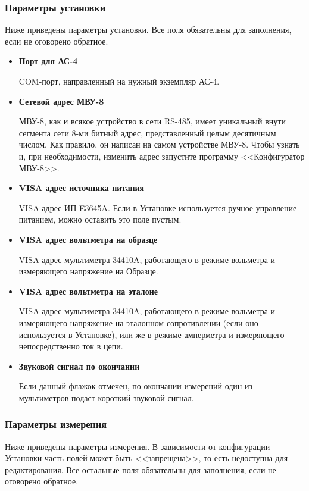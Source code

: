 \documentclass[12pt, a4paper, twocolumn]{report}
\newcommand{\PARAM}[1]{\item {\bf #1} }
\begin{document}
\subsubsection{Параметры установки}

Ниже приведены параметры установки. Все поля обязательны для заполнения, если не оговорено обратное.

\begin{itemize}

\PARAM{Порт для АС-4}

COM-порт, направленный на нужный экземпляр АС-4. 

\PARAM{Сетевой адрес МВУ-8}

МВУ-8, как и всякое устройство в сети RS-485, имеет уникальный внути сегмента сети 8-ми битный адрес, представленный целым десятичным числом. Как правило, он написан на самом устройстве МВУ-8. Чтобы узнать и, при необходимости, изменить адрес запустите программу <<Конфигуратор МВУ-8>>.

\PARAM{VISA адрес источника питания}

VISA-адрес ИП E3645A. Если в Установке используется ручное управление питанием, можно оставить это поле пустым.

\PARAM{VISA адрес вольтметра на образце}

VISA-адрес мультиметра 34410A, работающего в режиме вольметра и измеряющего напряжение на Образце.

\PARAM{VISA адрес вольтметра на эталоне}

VISA-адрес мультиметра 34410A, работающего в режиме вольметра и измеряющего напряжение на эталонном сопротивлении (если оно используется в Установке), или же в режиме амперметра и измеряющего непосредственно ток в цепи.

\PARAM{Звуковой сигнал по окончании}

Если данный флажок отмечен, по окончании измерений один из мультиметров подаст короткий звуковой сигнал.

\end{itemize}

\subsubsection{Параметры измерения}

Ниже приведены параметры измерения. В зависимости от конфигурации Установки часть полей может быть <<запрещена>>, то есть недоступна для редактирования. Все остальные поля обязательны для заполнения, если не оговорено обратное.
\end{document}
